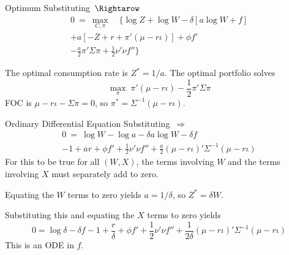 \documentclass[10pt]{beamer}
\begin{document}
\begin{frame}{Optimum}
Substituting $\,\Rightarow$
\begin{multline*} 0 \ = \ \max_{C,\pi} \quad \bigg\{\log Z + \log W - \delta [a \log W + f] \\ + a[-Z + r + \pi'(\mu - r\iota)] + \phi f'\\ 
- \frac{a}{2}\pi'\Sigma\pi  + \frac{1}{2}\nu'\nu f'' \bigg\}
\end{multline*}

The optimal consumption rate is $Z^*=1/a$.  The optimal portfolio solves
$$\max_\pi \; \pi'(\mu-r\iota) - \frac{1}{2}\pi'\Sigma\pi$$
FOC is $\mu-r\iota - \Sigma\pi=0$, so $\pi^* = \Sigma^{-1}(\mu-r\iota)$.

\end{frame}

\begin{frame}{Ordinary Differential Equation}
Substituting $\,\Rightarrow$
\begin{multline*} 0 \ = \ \log W - \log a - \delta a \log W - \delta f \\ 
-1 + ar + \phi f' + \frac{1}{2}\nu'\nu f'' +
 \frac{a}{2}(\mu - r\iota)'\Sigma^{-1}(\mu - r\iota) 
\end{multline*}
For this to be true for all $(W,X)$, the terms involving $W$ and the terms involving $X$ must separately add to zero.  

Equating the $W$ terms to zero yields $a = 1/\delta$, so $Z^* = \delta W$.  

Substituting this and equating the $X$ terms to zero yields
$$ 0= \log \delta - \delta f - 1 + \frac{r}{\delta} + \phi f' +  \frac{1}{2}\nu'\nu f'' +
 \frac{1}{2\delta}(\mu - r\iota)'\Sigma^{-1}(\mu - r\iota) 
$$
This is an ODE in $f$.
\end{frame}
\end{document}
